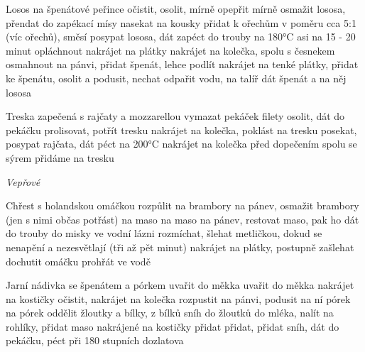 \documentclass[12pt,a4paper]{article}
\begin{document}
\begin{recipe}{Losos na špenátové peřince}
   očistit, osolit, mírně opepřit
   mírně osmažit lososa, přendat do zapékací mísy
   nasekat na kousky
   přidat k ořechům v poměru cca 5:1 (víc ořechů), směsí posypat lososa, dát zapéct do trouby na 180°C asi na 15 - 20 minut
   opláchnout
   nakrájet na plátky
   nakrájet na kolečka, spolu s česnekem osmahnout na pánvi, přidat špenát, lehce podlít
   nakrájet na tenké plátky, přidat ke špenátu, osolit a podusit, nechat odpařit vodu, na talíř dát špenát a na něj lososa
\end{recipe}
\newpage

\begin{recipe}{Treska zapečená s rajčaty a mozzarellou}
   vymazat pekáček
   filety osolit, dát do pekáčku
   prolisovat, potřít tresku
   nakrájet na kolečka, poklást na tresku
   posekat, posypat rajčata, dát péct na 200°C
   nakrájet na kolečka
   před dopečením spolu se sýrem přidáme na tresku
\end{recipe}
\newpage

\vspace*{\fill}
\hfill {\Huge\it Vepřové}\hfill
\vspace*{\fill}
\newpage

\begin{recipe}{Chřest s holandskou omáčkou}
   rozpůlit
   na brambory
   na pánev, osmažit brambory (jen s nimi občas potřást)
   na maso
   na maso
   na pánev, restovat maso, pak ho dát do trouby
   do misky ve vodní lázni
   rozmíchat, šlehat metličkou, dokud se nenapění a nezesvětlají (tři až pět minut)
   nakrájet na plátky, postupně zašlehat
   dochutit omáčku
   prohřát ve vodě
\end{recipe}
\newpage

\begin{recipe}{Jarní nádivka se špenátem a pórkem}
   uvařit do měkka
   uvařit do měkka
   nakrájet na kostičky
   očistit, nakrájet na kolečka
   rozpustit na pánvi, podusit na ní pórek
   na pórek
   oddělit žloutky a bílky, z bílků sníh
   do žloutků
   do mléka, nalít na rohlíky, přidat maso nakrájené na kostičky
   přidat
   přidat, přidat sníh, dát do pekáčku, péct při 180 stupních dozlatova
\end{recipe}
\newpage
\end{document}

